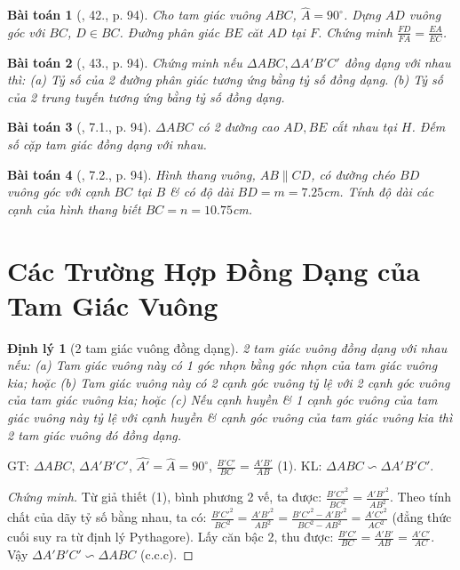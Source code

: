 \documentclass{article}
\newtheorem{baitoan}{Bài toán}
\newtheorem{dinhly}{Định lý}
\begin{document}
\begin{baitoan}[\cite{SBT_Toan_8_tap_2}, 42., p. 94]
	Cho tam giác vuông $ABC$, $\widehat{A} = 90^\circ$. Dựng $AD$ vuông góc với $BC$, $D\in BC$. Đường phân giác $BE$ căt $AD$ tại $F$. Chứng minh $\frac{FD}{FA} = \frac{EA}{EC}$.
\end{baitoan}

\begin{baitoan}[\cite{SBT_Toan_8_tap_2}, 43., p. 94]
	Chứng minh nếu $\Delta ABC,\Delta A'B'C'$ đồng dạng với nhau thì: (a) Tỷ số của 2 đường phân giác tương ứng bằng tỷ số đồng dạng. (b) Tỷ số của 2 trung tuyến tương ứng bằng tỷ số đồng dạng.	
\end{baitoan}

\begin{baitoan}[\cite{SBT_Toan_8_tap_2}, 7.1., p. 94]
	$\Delta ABC$ có 2 đường cao $AD,BE$ cắt nhau tại $H$. Đếm số cặp tam giác đồng dạng với nhau.
\end{baitoan}

\begin{baitoan}[\cite{SBT_Toan_8_tap_2}, 7.2., p. 94]
	Hình thang vuông, $AB\parallel CD$, có đường chéo $BD$ vuông góc với cạnh $BC$ tại $B$ \& có độ dài $BD = m = 7.25$\emph{cm}. Tính độ dài các cạnh của hình thang biết $BC = n = 10.75$\emph{cm}.
\end{baitoan}


\section{Các Trường Hợp Đồng Dạng của Tam Giác Vuông}

\begin{dinhly}[2 tam giác vuông đồng dạng]
	2 tam giác vuông đồng dạng với nhau nếu: (a) Tam giác vuông này có 1 góc nhọn bằng góc nhọn của tam giác vuông kia; hoặc (b) Tam giác vuông này có 2 cạnh góc vuông tỷ lệ với 2 cạnh góc vuông của tam giác vuông kia; hoặc (c) Nếu cạnh huyền \& 1 cạnh góc vuông của tam giác vuông này tỷ lệ với cạnh huyền \& cạnh góc vuông của tam giác vuông kia thì 2 tam giác vuông đó đồng dạng.
\end{dinhly}
GT: $\Delta ABC$, $\Delta A'B'C'$, $\widehat{A'} = \widehat{A} = 90^\circ$, $\frac{B'C'}{BC} = \frac{A'B'}{AB}$ (1). KL: $\Delta ABC\backsim\Delta A'B'C'$.

\begin{proof}[Chứng minh]
	Từ giả thiết (1), bình phương 2 vế, ta được: $\frac{B'C'^2}{BC^2} = \frac{A'B'^2}{AB^2}$. Theo tính chất của dãy tỷ số bằng nhau, ta có: $\frac{B'C'^2}{BC^2} = \frac{A'B'^2}{AB^2} = \frac{B'C'^2 - A'B'^2}{BC^2 - AB^2} = \frac{A'C'^2}{AC^2}$ (đẳng thức cuối suy ra từ định lý Pythagore). Lấy căn bậc 2, thu được: $\frac{B'C'}{BC} = \frac{A'B'}{AB} = \frac{A'C'}{AC}$. Vậy $\Delta A'B'C'\backsim\Delta ABC$ (c.c.c).
\end{proof}
\end{document}
